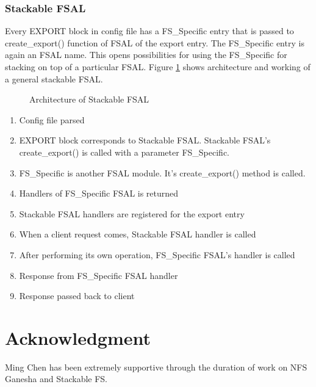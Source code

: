 \documentclass[11pt, journal, twocolumn, twoside]{IEEEtran}
\begin{document}
\subsubsection{Stackable FSAL}
Every EXPORT block in config file has a FS\_Specific entry that is passed to create\_export()
function of FSAL of the export entry. The FS\_Specific entry is again an FSAL name. This
opens possibilities for using the FS\_Specific for stacking on top of a particular FSAL.
Figure \ref{fsalStackArch} shows architecture and working of a  general stackable FSAL.

\begin{figure}[!btp]
  \centering
  \caption{Architecture of Stackable FSAL}
  \label{fsalStackArch}
\end{figure}

\begin{enumerate}
\item Config file parsed %
\item EXPORT block corresponds to Stackable FSAL. Stackable FSAL's create\_export() is called with a parameter FS\_Specific. %
\item FS\_Specific is another FSAL module. It's create\_export() method is called. %
\item Handlers of FS\_Specific FSAL is returned %
\item Stackable FSAL handlers are registered for the export entry %
\item When a client request comes, Stackable FSAL handler is called %
\item After performing its own operation, FS\_Specific FSAL's handler is called %
\item Response from FS\_Specific FSAL handler %
\item Response passed back to client %
\end{enumerate}

\section*{Acknowledgment}
Ming Chen has been extremely supportive through the duration of work on NFS Ganesha and Stackable FS.



\end{document}
